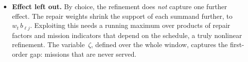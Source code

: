 \documentclass[11pt,a4paper]{article}
\theoremstyle{plain}
\theoremstyle{definition}
\theoremstyle{remark}
\begin{document}
\begin{itemize}
\begin{enumerate}
        A mission with $2c_j > \tau$ simply forces $\zeta_{ij} = 0$; at $2c_j = \tau$ its row admits only $\mu = v = 0$.
        So that mission is never assigned to that component, and the whole model does not become inconsistent.
    \end{enumerate}
  \item \textbf{Effect left out.} By choice, the refinement does \emph{not} capture one further effect.
    The repair weights shrink the support of each summand further, to $w_t\,b_{\ell j}$.
    Exploiting this needs a running maximum over products of repair factors and mission indicators that depend on the schedule, a truly nonlinear refinement.
    The variable~$\zeta$, defined over the whole window, captures the first-order gap: missions that are never served.
\end{itemize}
\end{document}
